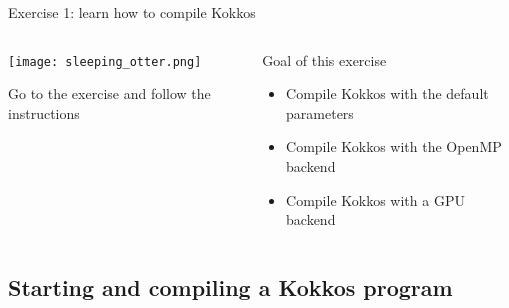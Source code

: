\documentclass[aspectratio=169]{beamer}
\begin{document}
\begin{exerciseframe}{Exercise 1: learn how to compile Kokkos}
    \begin{columns}
        \begin{column}{0.5\linewidth}
            \begin{center}
                \texttt{[image: sleeping\_otter.png]}
            \end{center}

            Go to the exercise  and follow the instructions
        \end{column}
        \begin{column}{0.5\linewidth}
            \begin{block}{Goal of this exercise}
                \begin{itemize}
                    \item Compile Kokkos with the default parameters
                    \item Compile Kokkos with the OpenMP backend
                    \item Compile Kokkos with a GPU backend
                \end{itemize}
            \end{block}
        \end{column}
    \end{columns}
\end{exerciseframe}


\subsection[Starting a Kokkos program]{Starting and compiling a Kokkos program}

\end{document}
